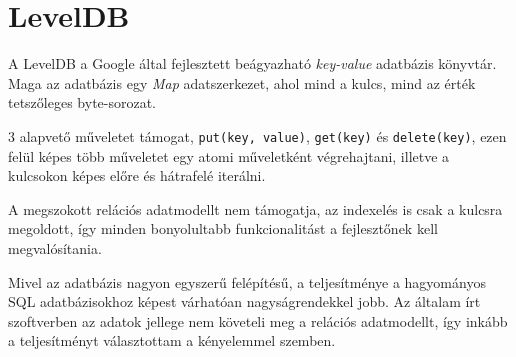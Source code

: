\section{LevelDB}

A LevelDB a Google által fejlesztett beágyazható \emph{key-value} adatbázis
könyvtár\cite{LevelDB}.
Maga az adatbázis egy \emph{Map} adatszerkezet, ahol mind a kulcs,
mind az érték tetszőleges byte-sorozat.

3 alapvető műveletet támogat, \verb=put(key, value)=, \verb=get(key)= és
\verb=delete(key)=, ezen felül képes több műveletet egy atomi műveletként
végrehajtani, illetve a kulcsokon képes előre és hátrafelé iterálni.

A megszokott relációs adatmodellt nem támogatja, az indexelés is csak a kulcsra
megoldott, így minden bonyolultabb funkcionalitást a fejlesztőnek kell
megvalósítania.

Mivel az adatbázis nagyon egyszerű felépítésű, a teljesítménye a hagyományos
SQL adatbázisokhoz képest várhatóan nagyságrendekkel jobb.
Az általam írt szoftverben az adatok jellege nem követeli meg a relációs
adatmodellt, így inkább a teljesítményt választottam a kényelemmel szemben.
